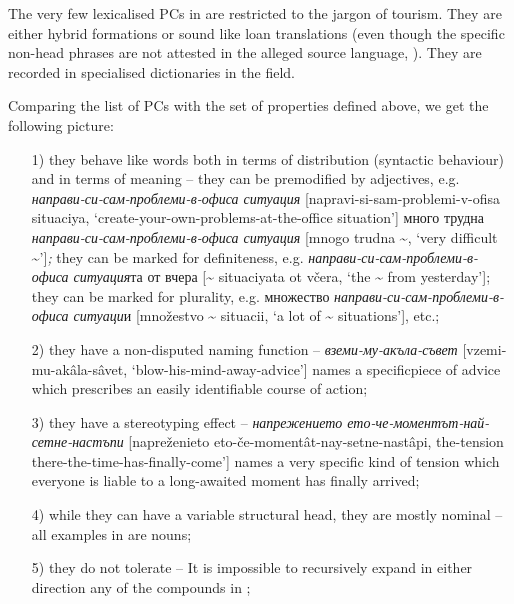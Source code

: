 \documentclass[output=paper]{LSP/langsci}
\begin{document}
The very few lexicalised PCs in  are restricted to the jargon of tourism. They are either hybrid formations or sound like loan translations (even though the specific non-head phrases are not attested in the alleged source language, ). They are recorded in specialised dictionaries in the field.



Comparing the list of  PCs with the set of properties defined above, we get the following picture:

\begin{itemize}

\item[1)] they behave like words both in terms of distribution (syntactic behaviour) and in terms of meaning – they can be premodified by adjectives, e.g. \textit{{направи-си-сам-проблеми-в-офиса ситуация}} [napravi-si-sam-problemi-v-ofisa situaciya, ‘create-your-own-problems-at-the-office situation’] {мно\-го трудна} \textit{{направи-си-сам-проблеми-в-офиса ситуация} }[mnogo trudna {\textasciitilde}, ‘very difficult {\textasciitilde}’]\textit{;} they can be marked for definiteness, e.g.   \textit{{направи-си-сам-проблеми-в-офиса ситуация}}{та} {от вчера [{\textasciitilde} situaciya}ta ot včera, ‘the {\textasciitilde} from yesterday’]; they can be marked for plurality, e.g. {множество} \textit{{направи-си-сам-проблеми-в-офиса ситуаци}}{и} [množestvo {\textasciitilde} situacii, ‘a lot of {\textasciitilde} situations’], etc.;

\item[2)] they have a non-disputed naming function – \textit{{вземи-му}-{акъла-съвет} }[vze\-mi-mu-akâla-sâvet, ‘blow-his-mind-away-advice’] names a specific\linebreak piece of advice which prescribes an easily identifiable course of action;

\item[3)] they have a stereotyping effect – \textit{{напрежението ето}-{че-моментът-най-сетне}-{настъпи} }[napreženieto eto-če-momentât-nay-setne-nastâpi, the-\linebreak tension there-the-time-has-finally-come’] names a very specific kind of tension which everyone is liable to a long-awaited moment has finally arrived;

\item[4)] while they can have a variable structural head, they are mostly nominal – all examples in  are nouns;

\item[5)] they do not tolerate  – It is impossible to recursively expand in either direction any of the compounds in ; 



\end{itemize}
\end{document}
